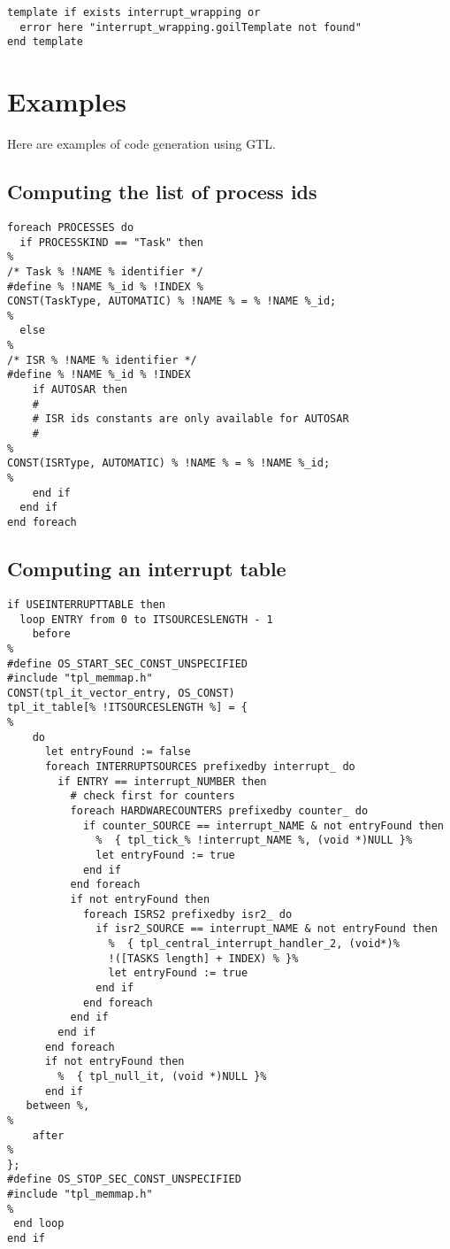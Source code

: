 \begin{lstlisting}
template if exists interrupt_wrapping or
  error here "interrupt_wrapping.goilTemplate not found"
end template
\end{lstlisting}

\section{Examples}

Here are examples of code generation using GTL.

\subsection{Computing the list of process ids}

\begin{lstlisting}
foreach PROCESSES do
  if PROCESSKIND == "Task" then
%
/* Task % !NAME % identifier */
#define % !NAME %_id % !INDEX %
CONST(TaskType, AUTOMATIC) % !NAME % = % !NAME %_id;
%
  else
%
/* ISR % !NAME % identifier */
#define % !NAME %_id % !INDEX 
    if AUTOSAR then
    #
    # ISR ids constants are only available for AUTOSAR
    #
%
CONST(ISRType, AUTOMATIC) % !NAME % = % !NAME %_id;
%
    end if
  end if
end foreach
\end{lstlisting}

\subsection{Computing an interrupt table}

\begin{lstlisting}
if USEINTERRUPTTABLE then
  loop ENTRY from 0 to ITSOURCESLENGTH - 1
    before
%
#define OS_START_SEC_CONST_UNSPECIFIED
#include "tpl_memmap.h"
CONST(tpl_it_vector_entry, OS_CONST)
tpl_it_table[% !ITSOURCESLENGTH %] = {
%
    do
      let entryFound := false
      foreach INTERRUPTSOURCES prefixedby interrupt_ do
        if ENTRY == interrupt_NUMBER then
          # check first for counters
          foreach HARDWARECOUNTERS prefixedby counter_ do
            if counter_SOURCE == interrupt_NAME & not entryFound then
              %  { tpl_tick_% !interrupt_NAME %, (void *)NULL }%
              let entryFound := true
            end if
          end foreach
          if not entryFound then
            foreach ISRS2 prefixedby isr2_ do
              if isr2_SOURCE == interrupt_NAME & not entryFound then
                %  { tpl_central_interrupt_handler_2, (void*)%
                !([TASKS length] + INDEX) % }%
                let entryFound := true
              end if
            end foreach
          end if
        end if
      end foreach
      if not entryFound then
        %  { tpl_null_it, (void *)NULL }%
      end if
   between %,
%
    after
%
};
#define OS_STOP_SEC_CONST_UNSPECIFIED
#include "tpl_memmap.h"
%
 end loop
end if
\end{lstlisting}

